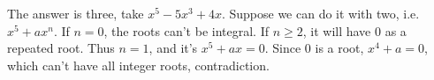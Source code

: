 The answer is three, take $x^5-5x^3+4x$.
Suppose we can do it with two, i.e. $x^5+ax^n$. If $n=0$, the roots can't be integral.
If $n\ge 2$, it will have $0$ as a repeated root. Thus $n=1$, and it's $x^5+ax=0$.
Since $0$ is a root, $x^4+a=0$, which can't have all integer roots, contradiction.
